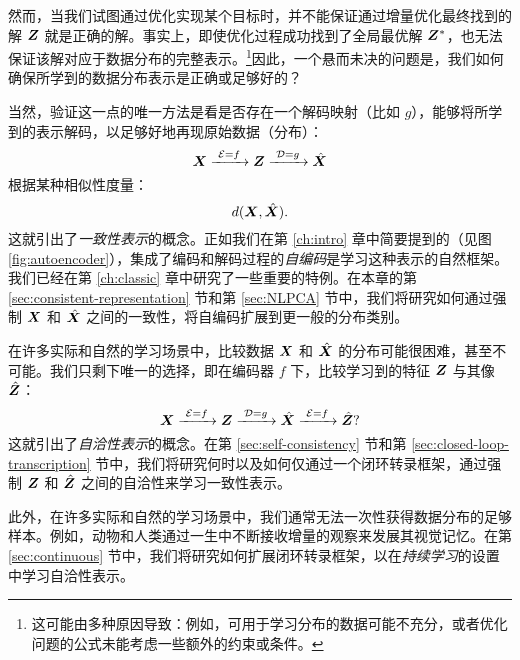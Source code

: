 \documentclass[../../book-main.tex]{subfiles}
\begin{document}
然而，当我们试图通过优化实现某个目标时，并不能保证通过增量优化最终找到的解 $\bm{Z}$ 就是正确的解。事实上，即使优化过程成功找到了全局最优解 $\bm{Z}^*$，也无法保证该解对应于数据分布的完整表示。\footnote{这可能由多种原因导致：例如，可用于学习分布的数据可能不充分，或者优化问题的公式未能考虑一些额外的约束或条件。}因此，一个悬而未决的问题是，我们如何确保所学到的数据分布表示是正确或足够好的？

当然，验证这一点的唯一方法是看是否存在一个解码映射（比如 $g$），能够将所学到的表示解码，以足够好地再现原始数据（分布）：
\begin{equation}
  \bm{X}
  \xrightarrow{\hspace{1mm} \mathcal{E} = f \hspace{1mm}} \bm{Z}
  \xrightarrow{\hspace{1mm} \mathcal{D} = g \hspace{1mm}} \hat{\bm{X}}
\end{equation}
根据某种相似性度量：
\begin{equation}
  d(\bm{X}, \hat {\bm{X}}).
\end{equation}
这就引出了{\em 一致性表示}的概念。正如我们在第 \ref{ch:intro} 章中简要提到的（见图 \ref{fig:autoencoder}），集成了编码和解码过程的{\em 自编码}是学习这种表示的自然框架。我们已经在第 \ref{ch:classic} 章中研究了一些重要的特例。在本章的第 \ref{sec:consistent-representation} 节和第 \ref{sec:NLPCA} 节中，我们将研究如何通过强制 $\bm{X}$ 和 $\hat {\bm{X}}$ 之间的一致性，将自编码扩展到更一般的分布类别。

在许多实际和自然的学习场景中，比较数据 $\bm{X}$ 和 $\hat {\bm{X}}$ 的分布可能很困难，甚至不可能。我们只剩下唯一的选择，即在编码器 $f$ 下，比较学习到的特征 $\bm{Z}$ 与其像 $\hat {\bm{Z}}$：
\begin{equation}
 \bm{X}
\xrightarrow{\hspace{1mm} \mathcal{E} = f \hspace{1mm}} \bm{Z}  \xrightarrow{\hspace{1mm} \mathcal{D} = g \hspace{1mm}} \hat{\bm{X}} \xrightarrow{\hspace{1mm} \mathcal{E} = f \hspace{1mm}} \hat {\bm{Z}}?
\end{equation}
这就引出了{\em 自洽性表示}的概念。在第 \ref{sec:self-consistency} 节和第 \ref{sec:closed-loop-transcription} 节中，我们将研究何时以及如何仅通过一个闭环转录框架，通过强制 $\bm{Z}$ 和 $\hat {\bm{Z}}$ 之间的自洽性来学习一致性表示。

此外，在许多实际和自然的学习场景中，我们通常无法一次性获得数据分布的足够样本。例如，动物和人类通过一生中不断接收增量的观察来发展其视觉记忆。在第 \ref{sec:continuous} 节中，我们将研究如何扩展闭环转录框架，以在{\em 持续学习}的设置中学习自洽性表示。
\end{document}
